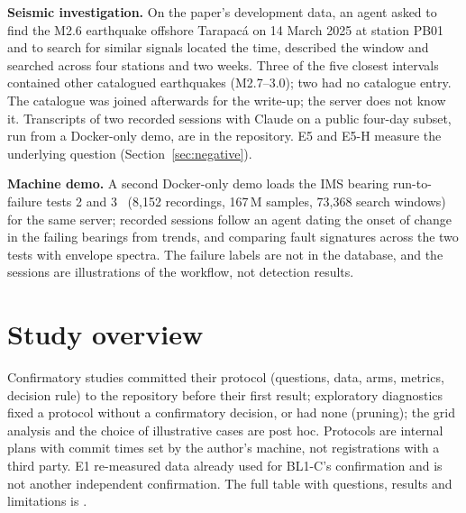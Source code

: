 \documentclass[sigconf,nonacm]{acmart}
\begin{document}
\textbf{Seismic investigation.} On the paper's development data, an agent asked to find the M2.6 earthquake offshore Tarapac\'a on 14 March 2025 at station PB01 and to search for similar signals located the time, described the window and searched across four stations and two weeks. Three of the five closest intervals contained other catalogued earthquakes (M2.7--3.0); two had no catalogue entry. The catalogue was joined afterwards for the write-up; the server does not know it. Transcripts of two recorded sessions with Claude on a public four-day subset, run from a Docker-only demo, are in the repository. E5 and E5-H measure the underlying question (Section~\ref{sec:negative}).

\textbf{Machine demo.} A second Docker-only demo loads the IMS bearing run-to-failure tests 2 and 3~\cite{ims} (8,152 recordings, 167\,M samples, 73,368 search windows) for the same server; recorded sessions follow an agent dating the onset of change in the failing bearings from trends, and comparing fault signatures across the two tests with envelope spectra. The failure labels are not in the database, and the sessions are illustrations of the workflow, not detection results.

\section{Study overview}\label{sec:studies}
Confirmatory studies committed their protocol (questions, data, arms, metrics, decision rule) to the repository before their first result; exploratory diagnostics fixed a protocol without a confirmatory decision, or had none (pruning); the grid analysis and the choice of illustrative cases are post hoc. Protocols are internal plans with commit times set by the author's machine, not registrations with a third party. E1 re-measured data already used for BL1-C's confirmation and is not another independent confirmation. The full table with questions, results and limitations is .
\end{document}
